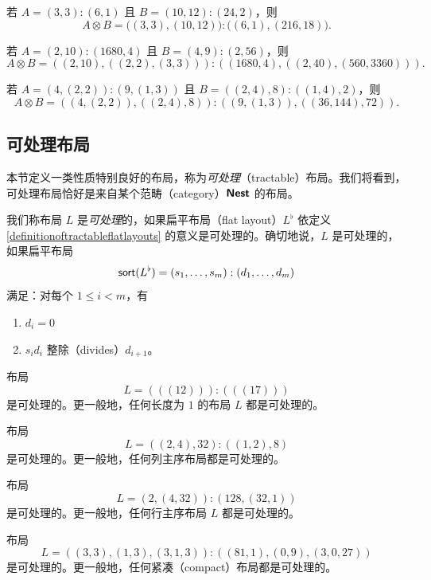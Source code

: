 \begin{example} 若 $A = (3,3):(6,1)$ 且 $B = (10,12):(24,2)$，则
    \[
    A \otimes B = \bigl((3,3),(10,12) \bigr) : \bigl((6,1),(216,18) \bigr).
    \]
\end{example}

\begin{example}
    若 $A = (2,10):(1680,4) $ 且 $B = (4,9):(2,56)$，则
    \[
    A \otimes B = ( (2,10) , ((2,2),(3,3) ) ) : ((1680,4), ( ( 2 ,40 ) , (560,3360 )  ) ).
    \]
\end{example}

\begin{example}
    若 $A = (4,(2,2)):(9,(1,3))$ 且 $B = ((2,4),8):((1,4),2)$，则
    \[
    A \otimes B = ( ( 4,(2,2)),((2,4),8 ) ) : ( ( 9,(1,3)),((36,144),72 ) ).
    \]
\end{example}

\subsection{可处理布局}

本节定义一类性质特别良好的布局，称为{\it 可处理}（tractable）布局。我们将看到，可处理布局恰好是来自某个范畴（category）${\boldsymbol{\mathsf{Nest}}}$ 的布局。

\begin{definition}\label{definitionoftractablelayouts}
    我们称布局 $L$ 是{\it 可处理}的，如果扁平布局（flat layout）$L^\flat$ 依定义 \ref{definitionoftractableflatlayouts} 的意义是可处理的。确切地说，$L$ 是可处理的，如果扁平布局
    \[
    \mathsf{sort}(L^\flat) = (s_1,\dots,s_m):(d_1,\dots,d_m)
    \]
    满足：对每个 $1 \leq i < m$，有
    \begin{enumerate}
        \item $d_i = 0$
        \item $s_id_i$ 整除（divides）$d_{i+1}$。
    \end{enumerate}
\end{definition}

\begin{example}
    布局
    \[L = (((12))):(((17)))\]
    是可处理的。更一般地，任何长度为 $1$ 的布局 $L$ 都是可处理的。
\end{example}

\begin{example}
    布局
    \[L = ((2,4),32):((1,2),8)\]
    是可处理的。更一般地，任何列主序布局都是可处理的。
\end{example}
\begin{example}
    布局
    \[L = (2,(4,32)):(128,(32,1))\]
    是可处理的。更一般地，任何行主序布局 $L$ 都是可处理的。
\end{example}
\begin{example}
    布局
    \[L = ((3,3),(1,3),(3,1,3)):((81,1),(0,9),(3,0,27))\]
    是可处理的。更一般地，任何紧凑（compact）布局都是可处理的。
\end{example}

